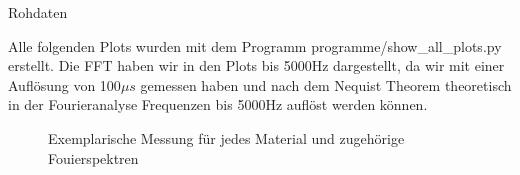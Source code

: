 \documentclass[twoside]{protokoll}
\begin{document}
\begin{aufgabe}{Rohdaten}
     
    Alle folgenden Plots wurden mit dem Programm programme/show\_all\_plots.py erstellt.
    Die FFT haben wir in den Plots bis 5000Hz dargestellt, da wir mit einer Auflösung von 100$\mu s$ gemessen haben und nach dem Nequist Theorem theoretisch in der Fourieranalyse Frequenzen bis 5000Hz auflöst werden können.
\begin{figure}[H]
    \caption{Exemplarische Messung für jedes Material und zugehörige Fouierspektren}
  \centering
\end{figure}
\begin{figure}[H]
  \centering

\end{figure}
\end{aufgabe}
\end{document}
